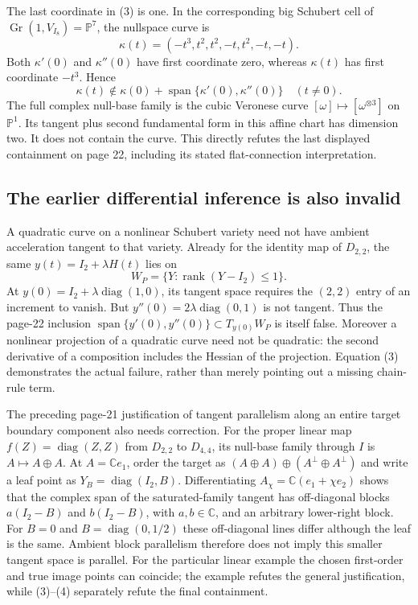\documentclass[10pt]{article}
\begin{document}
The last coordinate in (3) is one. In the corresponding big Schubert cell of \(\operatorname{Gr}(1,V_{I_8})=\mathbb P^7\), the nullspace curve is \[\kappa(t)=(-t^3,t^2,t^2,-t,t^2,-t,-t).\] Both \(\kappa'(0)\) and \(\kappa''(0)\) have first coordinate zero, whereas \(\kappa(t)\) has first coordinate \(-t^3\). Hence \[\kappa(t)\notin
 \kappa(0)+\operatorname{span}\{\kappa'(0),\kappa''(0)\}\quad(t\ne0).
 \tag{4}\] The full complex null-base family is the cubic Veronese curve \([\omega]\mapsto[\omega^{\otimes3}]\) on \(\mathbb P^1\). Its tangent plus second fundamental form in this affine chart has dimension two. It does not contain the curve. This directly refutes the last displayed containment on page 22, including its stated flat-connection interpretation.\par
\subsection*{The earlier differential inference is also invalid}
A quadratic curve on a nonlinear Schubert variety need not have ambient acceleration tangent to that variety. Already for the identity map of \(D_{2,2}\), the same \(y(t)=I_2+\lambda H(t)\) lies on \[W_P=\{Y:\operatorname{rank}(Y-I_2)\le1\}.\] At \(y(0)=I_2+\lambda\operatorname{diag}(1,0)\), its tangent space requires the \((2,2)\) entry of an increment to vanish. But \(y''(0)=2\lambda\operatorname{diag}(0,1)\) is not tangent. Thus the page-22 inclusion \(\operatorname{span}\{y'(0),y''(0)\}\subset T_{y(0)}W_P\) is itself false. Moreover a nonlinear projection of a quadratic curve need not be quadratic: the second derivative of a composition includes the Hessian of the projection. Equation (3) demonstrates the actual failure, rather than merely pointing out a missing chain-rule term.\par
The preceding page-21 justification of tangent parallelism along an entire target boundary component also needs correction. For the proper linear map \(f(Z)=\operatorname{diag}(Z,Z)\) from \(D_{2,2}\) to \(D_{4,4}\), its null-base family through \(I\) is \(A\mapsto A\oplus A\). At \(A=\mathbb Ce_1\), order the target as \((A\oplus A)\oplus(A^\perp\oplus A^\perp)\) and write a leaf point as \(Y_B=\operatorname{diag}(I_2,B)\). Differentiating \(A_\chi=\mathbb C(e_1+\chi e_2)\) shows that the complex span of the saturated-family tangent has off-diagonal blocks \(a(I_2-B)\) and \(b(I_2-B)\), with \(a,b\in\mathbb C\), and an arbitrary lower-right block. For \(B=0\) and \(B=\operatorname{diag}(0,1/2)\) these off-diagonal lines differ although the leaf is the same. Ambient block parallelism therefore does not imply this smaller tangent space is parallel. For the particular linear example the chosen first-order and true image points can coincide; the example refutes the general justification, while (3)–(4) separately refute the final containment.\par
\end{document}
